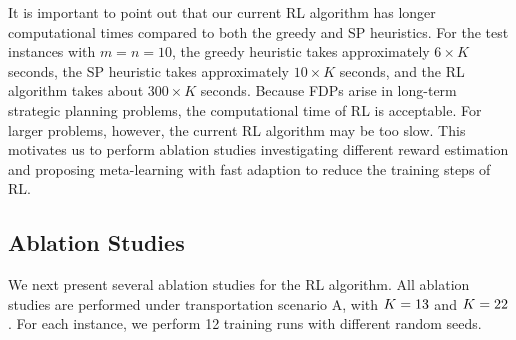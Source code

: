 \documentclass{article} %
\begin{document}
It is important to point out that our current RL algorithm has longer computational times compared to both the greedy and SP heuristics. For the test instances with $m=n=10$, the greedy heuristic takes approximately $6\times K$ seconds, the SP heuristic takes approximately $10\times K$ seconds, and the RL algorithm takes about $300\times K$ seconds. Because FDPs arise in long-term strategic planning problems, the computational time of RL is acceptable. 
For larger problems, however, the current RL algorithm may be too slow. This motivates us to perform ablation studies investigating different reward estimation and proposing meta-learning with fast adaption to reduce the training steps of RL.
















\subsection{Ablation Studies}\label{sec:ablation}
We next present several ablation studies for the RL algorithm.
All ablation studies are performed under transportation scenario A, with $K=13$ and $K=22$. For each instance, we perform 12 training runs with different random seeds. 
\end{document}
